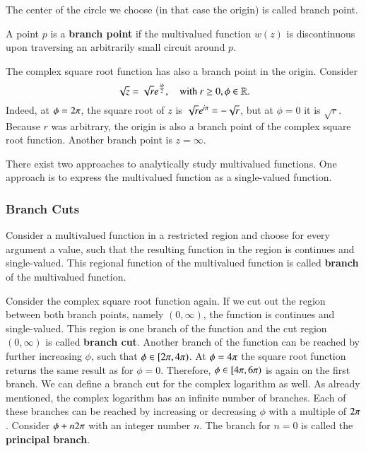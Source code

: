 The center of the circle we choose (in that case the origin) is called branch point.

\begin{definition}
A point $p$ is a \textbf{branch point} if the multivalued function $w(z)$ is discontinuous upon traversing an arbitrarily small circuit around $p$.
\end{definition}

The complex square root function has also a branch point in the origin. Consider
\begin{equation}
\sqrt{z} = \sqrt{r} {e}^{\frac{{i}\phi}{2}},\quad \text{with } r \geq 0, \phi \in \mathbb{R}.
\end{equation}
Indeed, at $\phi = 2{\pi}$, the square root of $z$ is $\sqrt{r}{e}^{{i}{\pi}} = -\sqrt{r}$, but at $\phi = 0$ it is $\sqrt{r}$. Because $r$ was arbitrary, the origin is also a branch point of the complex square root function. Another branch point is $z = \infty$.

There exist two approaches to analytically study multivalued functions. One approach is to express the multivalued function as a single-valued function.

\subsubsection{Branch Cuts}\label{subsec:branch-cuts}
Consider a multivalued function in a restricted region and choose for every argument a value, such that the resulting function in the region is continues and single-valued. This regional function of the multivalued function is called \textbf{branch} of the multivalued function. 

Consider the complex square root function again. If we cut out the region between both branch points, namely $(0, \infty)$, the function is continues and single-valued. This region is one branch of the function and the cut region $(0, \infty)$ is called \textbf{branch cut}. Another branch of the function can be reached by further increasing $\phi$, such that $\phi \in [2{\pi}, 4{\pi})$. At $\phi = 4{\pi}$ the square root function returns the same result as for $\phi=0$. Therefore, $\phi \in [4{\pi}, 6{\pi})$ is again on the first branch. We can define a branch cut for the complex logarithm as well. As already mentioned, the complex logarithm has an infinite number of branches. Each of these branches can be reached by increasing or decreasing $\phi$ with a multiple of $2{\pi}$. Consider $\phi+n2{\pi}$ with an integer number $n$. The branch for $n=0$ is called the \textbf{principal branch}.

